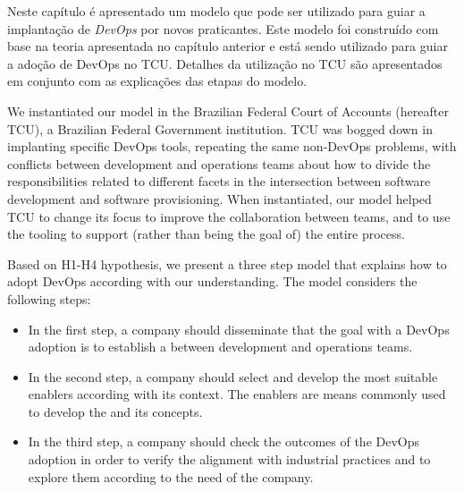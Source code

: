 Neste capítulo é apresentado um modelo que pode ser utilizado para guiar a
implantação de \textit{DevOps} por novos praticantes. Este modelo foi construído
com base na teoria apresentada no capítulo anterior e está sendo
utilizado para guiar a adoção de DevOps no \acrshort{TCU}. Detalhes da
utilização no \acrshort{TCU} são apresentados em conjunto com as explicações
das etapas do modelo.

We instantiated our model in the Brazilian Federal Court of Accounts (hereafter TCU), a Brazilian Federal
Government institution. TCU was bogged down in implanting specific DevOps tools, repeating the same non-DevOps problems, with
conflicts between development and operations teams about how to divide the responsibilities related to different facets in the intersection between software development and software provisioning.
When instantiated, our model helped TCU to change its focus to
improve the collaboration between teams, and to use the tooling
to support (rather than being the goal of) the entire process.

Based on H1-H4 hypothesis, we present a three step model that
explains how to adopt DevOps according with our understanding. The
model considers the following steps:

\begin{itemize}
\item In the first step, a company should
disseminate that the goal with a DevOps adoption is to
establish a \cc between
development and operations teams.

\item In the second step, a company should select and develop
the most suitable enablers according with its context. The enablers
are means commonly used to develop the \cc
and its concepts.

\item In the third step, a company should check the outcomes of the
DevOps adoption in order to verify the alignment with
industrial practices and to explore them according to the
need of the company.
\end{itemize}

